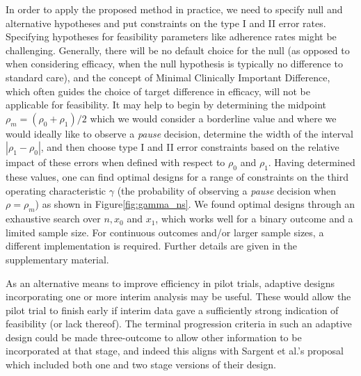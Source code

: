 \documentclass{bmcart}
\begin{document}
In order to apply the proposed method in practice, we need to specify null and alternative hypotheses and put constraints on the type I and II error rates. Specifying hypotheses for feasibility parameters like adherence rates might be challenging. Generally, there will be no default choice for the null (as opposed to when considering efficacy, when the null hypothesis is typically no difference to standard care), and the concept of Minimal Clinically Important Difference, which often guides the choice of target difference in efficacy, will not be applicable for feasibility. It may help to begin by determining the midpoint $\rho_m = (\rho_0 + \rho_1)/2$ which we would consider a borderline value and where we would ideally like to observe a \emph{pause} decision, determine the width of the interval $|\rho_1 - \rho_0|$, and then choose type I and II error constraints based on the relative impact of these errors when defined with respect to $\rho_0$ and $\rho_1$. Having determined these values, one can find optimal designs for a range of constraints on the third operating characteristic $\gamma$ (the probability of observing a   \emph{pause} decision when $\rho = \rho_m$) as shown in Figure\ref{fig:gamma_ns}. We found optimal designs through an exhaustive search over $n, x_0$ and $x_1$, which works well for a binary outcome and a limited sample size. For continuous outcomes and/or larger sample sizes, a different implementation is required. Further details are given in the supplementary material. 

As an alternative means to improve efficiency in pilot trials, adaptive designs incorporating one or more interim analysis may be useful. These would allow the pilot trial to finish early if interim data gave a sufficiently strong indication of feasibility (or lack thereof). The terminal progression criteria in such an adaptive design could be made three-outcome to allow other information to be incorporated at that stage, and indeed this aligns with Sargent et al.'s \cite{Sargent2001} proposal which included both one and two stage versions of their design. 
\end{document}
